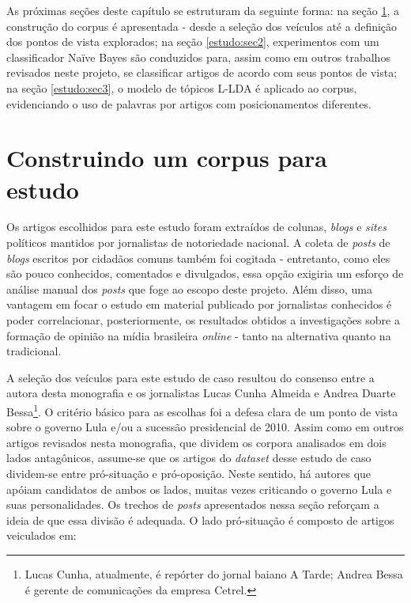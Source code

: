 As próximas seções deste capítulo se estruturam da seguinte forma: na seção \ref{estudo:sec1}, a construção do corpus é apresentada - desde a seleção dos veículos até a definição dos pontos de vista explorados; na seção \ref{estudo:sec2}, experimentos com um classificador Naïve Bayes são conduzidos para, assim como em outros trabalhos revisados neste projeto, se classificar artigos de acordo com seus pontos de vista; na seção \ref{estudo:sec3}, o modelo de tópicos L-LDA é aplicado ao corpus, evidenciando o uso de palavras por artigos com posicionamentos diferentes. 


\section{Construindo um corpus para estudo}
\label{estudo:sec1}


Os artigos escolhidos para este estudo foram extraídos de colunas, \emph{blogs} e \emph{sites} políticos mantidos por jornalistas de notoriedade nacional. A coleta de \emph{posts} de \emph{blogs} escritos por cidadãos comuns também foi cogitada - entretanto, como eles são pouco conhecidos, comentados e divulgados, essa opção exigiria um esforço de análise manual dos \emph{posts} que foge ao escopo deste projeto. Além disso, uma vantagem em focar o estudo em material publicado por jornalistas conhecidos é poder correlacionar, posteriormente, os resultados obtidos a investigações sobre a formação de opinião na mídia brasileira \emph{online} - tanto na alternativa quanto na tradicional. 

A seleção dos veículos para este estudo de caso resultou do consenso entre a autora desta monografia e os jornalistas Lucas Cunha Almeida e Andrea Duarte Bessa\footnote{Lucas Cunha, atualmente, é repórter do jornal baiano A Tarde; Andrea Bessa é gerente de comunicações da empresa Cetrel.}. O critério básico para as escolhas foi a defesa clara de um ponto de vista sobre o governo Lula e/ou a sucessão presidencial de 2010. Assim como em outros artigos revisados nesta monografia, que dividem os corpora analisados em dois lados antagônicos, assume-se que os artigos do \emph{dataset} desse estudo de caso dividem-se entre pró-situação e pró-oposição. Neste sentido, há autores que apóiam candidatos de ambos os lados, muitas vezes criticando o governo Lula e suas personalidades. Os trechos de \emph{posts} apresentados nessa seção reforçam a ideia de que essa divisão é adequada. O lado pró-situação é composto de artigos veiculados em:


